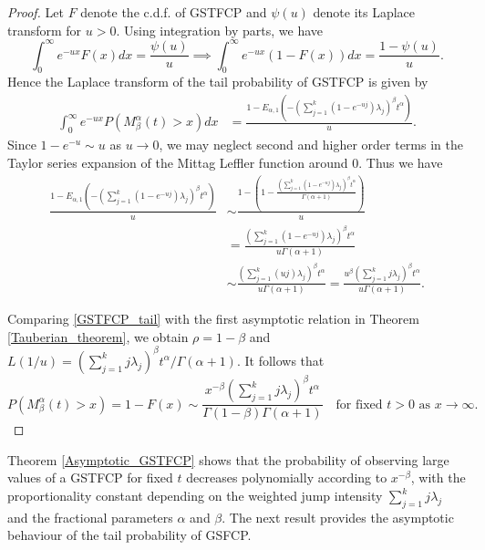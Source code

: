\documentclass[11pt,oneside,reqno]{amsart}
\theoremstyle{definition}
\theoremstyle{remarkstyle}
\begin{document}
\begin{proof}
Let $F$ denote the c.d.f. of GSTFCP and $\psi(u)$ denote its Laplace transform for $u>0$. Using integration by parts, we have
\begin{equation*}
\int_{0}^{\infty} e^{-ux}F(x) dx = \frac{\psi(u)}{u} \implies \int_{0}^{\infty} e^{-ux}(1-F(x)) dx = \frac{1-\psi(u)}{u}. 
\end{equation*}
Hence the Laplace transform of the tail probability of GSTFCP is given by
    \begin{align*}
        \int_{0}^{\infty}e^{-u x}P(M_{\beta}^{\alpha}(t)>x)dx
        &=\frac{1-E_{\alpha,1}(-(\sum_{j=1}^{k}(1-e^{-u j})\lambda_j)^\beta t^\alpha)}{u}.
    \end{align*}
    Since $1-e^{-u}\sim u$ as $u\to 0$, we may neglect second and higher order terms in the Taylor series expansion of the Mittag Leffler function around $0$. Thus we have
    \begin{align}
        \frac{1-E_{\alpha,1}(-(\sum_{j=1}^{k}(1-e^{-uj})\lambda_j)^\beta t^\alpha)}{u}
        &\sim\frac{1-(1-\frac{(\sum_{j=1}^{k}(1-e^{-uj})\lambda_j)^\beta t^\alpha}{\Gamma(\alpha+1)})}{u}\nonumber\\
        &=\frac{(\sum_{j=1}^{k}(1-e^{-uj})\lambda_j)^\beta t^\alpha}{u\Gamma(\alpha+1)}\nonumber\\
        &\sim\frac{(\sum_{j=1}^{k}(uj)\lambda_j)^\beta t^\alpha}{u\Gamma(\alpha+1)}=\frac{u^\beta(\sum_{j=1}^{k}j\lambda_j)^\beta t^\alpha}{u\Gamma(\alpha+1)}\label{GSTFCP_tail}.
    \end{align}

    Comparing \eqref{GSTFCP_tail} with the first asymptotic relation in Theorem \ref{Tauberian_theorem}, we obtain $\rho=1-\beta$ and $L(1/u)=(\sum_{j=1}^{k}j\lambda_j)^\beta t^\alpha/\Gamma(\alpha+1)$. It follows that
    \begin{equation*}
        P(M_{\beta}^{\alpha}(t)>x)=1-F(x)\sim\frac{x^{-\beta} (\sum_{j=1}^{k}j\lambda_j)^{\beta}t^{\alpha}}{\Gamma(1-\beta)\Gamma(\alpha+1)}\quad \text{for fixed}\,\, t > 0\,\, \text{as}\,\, x\to \infty.
    \end{equation*}
\end{proof}
Theorem \ref{Asymptotic_GSTFCP} shows that the probability of observing large values of a GSTFCP for fixed $t$ decreases polynomially according to $x^{-\beta}$, with the proportionality constant depending on the weighted jump intensity $\sum_{j=1}^{k}j\lambda_j$ and the fractional parameters $\alpha$ and $\beta$. The next result provides the asymptotic behaviour of the tail probability of GSFCP. 
\end{document}
